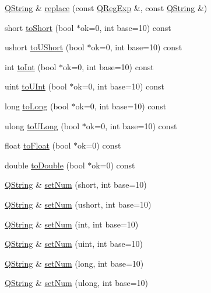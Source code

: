 \begin{DoxyCompactItemize}
\item 
\hyperlink{class_q_string}{Q\-String} \& \hyperlink{class_q_string_a3c5037b5c33cf5a2c3b8b24bb6a42d88}{replace} (const \hyperlink{class_q_reg_exp}{Q\-Reg\-Exp} \&, const \hyperlink{class_q_string}{Q\-String} \&)
\item 
short \hyperlink{class_q_string_a25b1c9d62a049c0c8a27f8583e282578}{to\-Short} (bool $\ast$ok=0, int base=10) const 
\item 
ushort \hyperlink{class_q_string_aaf4ae4c4d8b05e39f3024baafb11e601}{to\-U\-Short} (bool $\ast$ok=0, int base=10) const 
\item 
int \hyperlink{class_q_string_a3196e99dac9c3771a0293f077cef9a65}{to\-Int} (bool $\ast$ok=0, int base=10) const 
\item 
uint \hyperlink{class_q_string_a63efec6c9f984c0e2a8937275fffbb2b}{to\-U\-Int} (bool $\ast$ok=0, int base=10) const 
\item 
long \hyperlink{class_q_string_af26933f407461f3709af304e5d589518}{to\-Long} (bool $\ast$ok=0, int base=10) const 
\item 
ulong \hyperlink{class_q_string_a4ca240b0e2f5b86c5de0a34e240392d1}{to\-U\-Long} (bool $\ast$ok=0, int base=10) const 
\item 
float \hyperlink{class_q_string_a8e592b921e86fac8b959c8d4c9f316b6}{to\-Float} (bool $\ast$ok=0) const 
\item 
double \hyperlink{class_q_string_a9d4f757398267b7438e3b37268796ff8}{to\-Double} (bool $\ast$ok=0) const 
\item 
\hyperlink{class_q_string}{Q\-String} \& \hyperlink{class_q_string_a43b6881602fb1e0760113c83e37eb3a0}{set\-Num} (short, int base=10)
\item 
\hyperlink{class_q_string}{Q\-String} \& \hyperlink{class_q_string_a151a1fb07512644e69fc1b530fa5edbd}{set\-Num} (ushort, int base=10)
\item 
\hyperlink{class_q_string}{Q\-String} \& \hyperlink{class_q_string_a4ca9cba45d51337e37dd6423abd4e9b7}{set\-Num} (int, int base=10)
\item 
\hyperlink{class_q_string}{Q\-String} \& \hyperlink{class_q_string_aa7ef7bdf890844491aefc3f803b020de}{set\-Num} (uint, int base=10)
\item 
\hyperlink{class_q_string}{Q\-String} \& \hyperlink{class_q_string_a35bd218b74b3ee76892ff1bf40c43d3d}{set\-Num} (long, int base=10)
\item 
\hyperlink{class_q_string}{Q\-String} \& \hyperlink{class_q_string_a89382b0c6dfbd0b84ee0d8e68e37e0ce}{set\-Num} (ulong, int base=10)

\end{DoxyCompactItemize}
